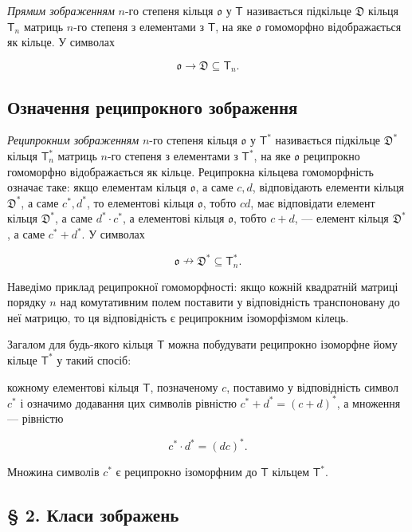 \documentclass[11pt]{article}
\begin{document}
\emph{Прямим зображенням} \(n\)-го степеня кільця \(\mathfrak{o}\) у \(\mathsf T\) називається підкільце \(\mathfrak D\) кільця \(\mathsf T_n\) матриць \(n\)-го степеня з елементами з \(\mathsf T\), на яке \(\mathfrak{o}\) гомоморфно відображається як кільце. У символах

\[
\mathfrak{o}\to\mathfrak D\subseteq\mathsf T_n.
\]

\subsection*{Означення реципрокного зображення}\label{definition-der-reziproken-darstellung}

\emph{Реципрокним зображенням} \(n\)-го степеня кільця \(\mathfrak{o}\) у \(\mathsf T^*\) називається підкільце \(\mathfrak D^*\) кільця \(\mathsf T_n^*\) матриць \(n\)-го степеня з елементами з \(\mathsf T^*\), на яке \(\mathfrak{o}\) реципрокно гомоморфно відображається як кільце. Реципрокна кільцева гомоморфність означає таке: якщо елементам кільця \(\mathfrak{o}\), а саме \(c,d\), відповідають елементи кільця \(\mathfrak D^*\), а саме \(c^*,d^*\), то елементові кільця \(\mathfrak{o}\), тобто \(cd\), має відповідати елемент кільця \(\mathfrak D^*\), а саме \(d^*\cdot c^*\), а елементові кільця \(\mathfrak{o}\), тобто \(c+d\), --- елемент кільця \(\mathfrak D^*\), а саме \(c^*+d^*\). У символах

\[
\mathfrak{o}\nrightarrow\mathfrak D^*\subseteq\mathsf T_n^*.
\]

Наведімо приклад реципрокної гомоморфності: якщо кожній квадратній матриці порядку \(n\) над комутативним полем поставити у відповідність транспоновану до неї матрицю, то ця відповідність є реципрокним ізоморфізмом кілець.

Загалом для будь-якого кільця \(\mathsf T\) можна побудувати реципрокно ізоморфне йому кільце \(\mathsf T^*\) у такий спосіб:

кожному елементові кільця \(\mathsf T\), позначеному \(c\), поставимо у відповідність символ \(c^*\) і означимо додавання цих символів рівністю \(c^*+d^*=(c+d)^*\), а множення --- рівністю

\[
c^*\cdot d^*=(dc)^*.
\]

Множина символів \(c^*\) є реципрокно ізоморфним до \(\mathsf T\) кільцем \(\mathsf T^*\).

\subsection*{§ 2. Класи зображень}\label{darstellungsklassen}
\end{document}
